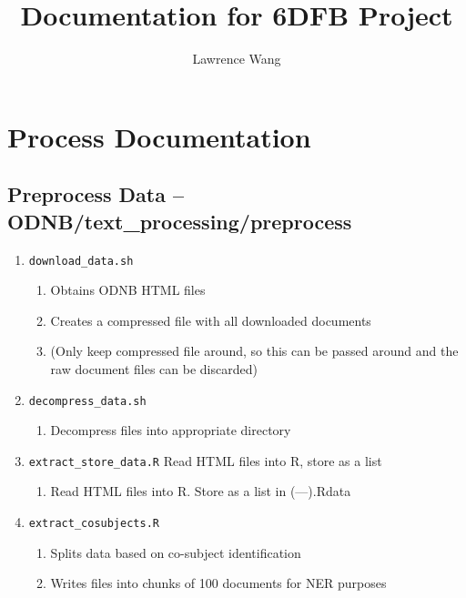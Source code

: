 \documentclass[11pt]{article}
\newcommand{\filename}[1]{ \texttt{#1}}
\begin{document}
\title{Documentation for 6DFB Project}
\author{Lawrence Wang}

\maketitle
\tableofcontents
\pagebreak

\section{Process Documentation}

\subsection{Preprocess Data -- ODNB/text\_processing/preprocess}

\begin{enumerate}
\item \filename{download\_data.sh}
\begin{enumerate}
\item Obtains ODNB HTML files
\item Creates a compressed file with all downloaded documents
\item (Only keep compressed file around, so this can be passed around and the raw document files can be discarded)
\end{enumerate}

\item \filename{decompress\_data.sh} 
\begin{enumerate}
\item Decompress files into appropriate directory
\end{enumerate}

\item \filename{extract\_store\_data.R}
Read HTML files into R, store as a list
\begin{enumerate}
\item Read HTML files into R. Store as a list in (---).Rdata
\end{enumerate}

\item \filename{extract\_cosubjects.R}
\begin{enumerate}
\item Splits data based on co-subject identification
\item Writes files into chunks of 100 documents for NER purposes
\end{enumerate}

\end{enumerate}
\end{document}

